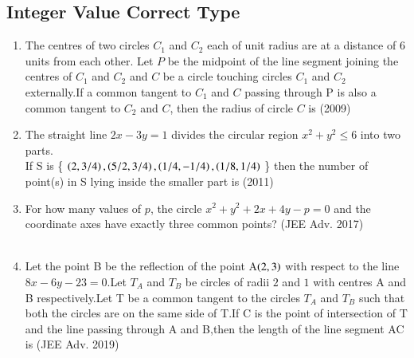 \documentclass[journal]{IEEEtran}
\numberwithin{equation}{enumi}
\numberwithin{figure}{enumi}
\begin{document}
\subsection{Integer Value Correct Type}
\begin{enumerate}
\item The centres of two circles $C_1$ and $C_2$ each of unit radius are at a distance of $6$ units from each other. Let $P$ be the midpoint of the line segment joining the centres of $C_1$ and $C_2$ and $C$ be a circle touching circles $C_1$ and $C_2$ externally.If a common tangent to $C_1$ and $C$ passing through P is also a common tangent to $C_2$ and $C$, then the radius of circle $C$ is \hfill(2009)\\
\item The straight line $2x-3y=1$ divides the circular region $x^2+y^2\leq6$ into two parts.\\
If  S  is \{ $\left(2,3/4\right),\left(5/2,3/4\right),\left(1/4,-1/4\right),\left(1/8,1/4\right)$ \}  then the  number of point(s) in S lying inside the smaller part is \hfill(2011)\\
\item For how many values of $p$, the circle $x^2+y^2+2x+4y-p=0$ and the coordinate axes have exactly three common points? \hfill(JEE Adv. 2017)\\
\\
\item Let the point B be the reflection of the point A$\left(2,3\right)$ with respect to the line $8x-6y-23=0$.Let $T_A$ and $T_B$ be circles of radii $2$ and $1$ with centres A and B respectively.Let T be a common tangent to the circles $T_A$ and $T_B$ such that both the circles are on the same side of T.If C is the point of intersection of T and the line passing through A and B,then the length of the line segment AC is \hfill(JEE Adv. 2019)
\end{enumerate}
\end{document}
